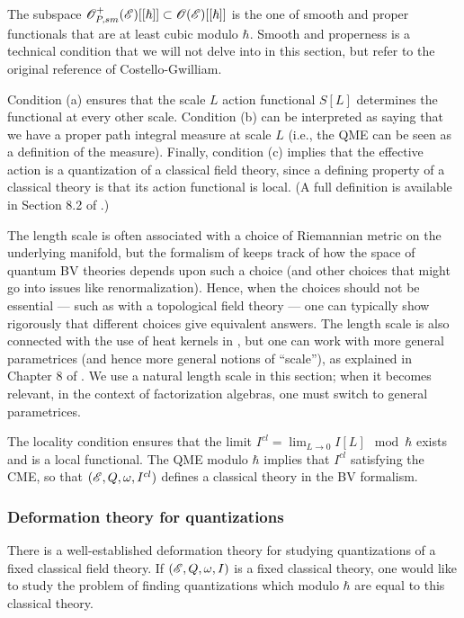 The subspace $\mathscr O_{P,sm}^+(\mathscr E)[[\hbar]] \subset \mathscr O(\mathscr E)[[\hbar]]$ is the one of smooth and proper functionals that are at least cubic modulo $\hbar$. 
Smooth and properness is a technical condition that we will not delve into in this section, but refer to the original reference of Costello-Gwilliam.

Condition (a) ensures that the scale $L$ action functional $S[L]$ determines the functional at every other scale.
Condition (b) can be interpreted as saying that we have a proper path integral measure at scale $L$ 
(i.e., the QME can be seen as a definition of the measure).
Finally, condition (c) implies that the effective action is a quantization of a classical field theory,
since a defining property of a classical theory is that its action functional is local.
(A full definition is available in Section 8.2 of \cite{CG2}.)

\begin{rmk}
The length scale is often associated with a choice of Riemannian metric on the underlying manifold,
but the formalism of \cite{CostelloRenormalization} keeps track of how the space of quantum BV theories depends upon such a choice 
(and other choices that might go into issues like renormalization).
Hence, when the choices should not be essential --- such as with a topological field theory --- one can typically show rigorously that different choices give equivalent answers.
The length scale is also connected with the use of heat kernels in \cite{CostelloRenormalization},
but one can work with more general parametrices (and hence more general notions of ``scale''),
as explained in Chapter 8 of \cite{CG2}.
We use a natural length scale in this section; 
when it becomes relevant, in the context of factorization algebras, one must switch to general parametrices.
\end{rmk}

The locality condition ensures that the limit $I^{cl} = \lim_{L \to 0} I[L] \mod \hbar$ exists and is a local functional.
The QME modulo $\hbar$ implies that $I^{cl}$ satisfying the CME, so that $(\mathscr E, Q, \omega, I^{cl})$ defines a classical theory in the BV formalism.

\subsubsection{Deformation theory for quantizations}

There is a well-established deformation theory for studying quantizations of a fixed classical field theory.
If $(\mathscr E, Q, \omega, I)$ is a fixed classical theory, one would like to study the problem of finding quantizations which modulo $\hbar$ are equal to this classical theory. 

